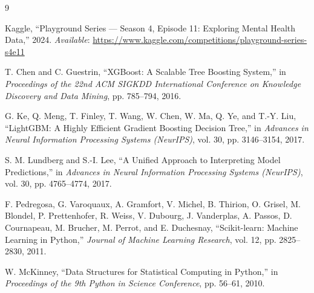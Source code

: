\begin{thebibliography}{9}

Kaggle, ``Playground Series --- Season 4, Episode 11: Exploring Mental Health Data,'' 2024.
\textit{Available}: \url{https://www.kaggle.com/competitions/playground-series-s4e11}

T. Chen and C. Guestrin, ``XGBoost: A Scalable Tree Boosting System,'' in \textit{Proceedings of the 22nd ACM SIGKDD International Conference on Knowledge Discovery and Data Mining}, pp. 785--794, 2016.

G. Ke, Q. Meng, T. Finley, T. Wang, W. Chen, W. Ma, Q. Ye, and T.-Y. Liu, ``LightGBM: A Highly Efficient Gradient Boosting Decision Tree,'' in \textit{Advances in Neural Information Processing Systems (NeurIPS)}, vol. 30, pp. 3146--3154, 2017.

S. M. Lundberg and S.-I. Lee, ``A Unified Approach to Interpreting Model Predictions,'' in \textit{Advances in Neural Information Processing Systems (NeurIPS)}, vol. 30, pp. 4765--4774, 2017.

F. Pedregosa, G. Varoquaux, A. Gramfort, V. Michel, B. Thirion, O. Grisel, M. Blondel, P. Prettenhofer, R. Weiss, V. Dubourg, J. Vanderplas, A. Passos, D. Cournapeau, M. Brucher, M. Perrot, and E. Duchesnay, ``Scikit-learn: Machine Learning in Python,'' \textit{Journal of Machine Learning Research}, vol. 12, pp. 2825--2830, 2011.

W. McKinney, ``Data Structures for Statistical Computing in Python,'' in \textit{Proceedings of the 9th Python in Science Conference}, pp. 56--61, 2010.

\end{thebibliography}
